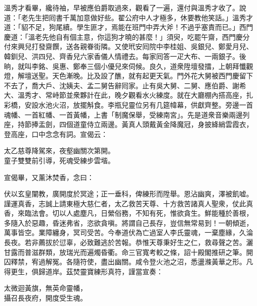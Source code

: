 溫秀才看畢，纔待袖，早被應伯爵取過來，觀看了一遍，還付與溫秀才收了。說道：「老先生把囘書千萬加意做好些。翟公府中人才極多，休要教他笑話。」溫秀才道：「貂不足，狗尾續。學生匪才，焉能在班門中弄大斧！不過乎塞責而已。」西門慶道：「溫老先他自有個主意，你這狗才曉的甚麼！」須臾，吃罷午齋，西門慶分付來興兒打發齋饌，送各親眷街隣。又使玳安囘院中李桂姐、吳銀兒、鄭愛月兒、韓釧兒、洪四兒、齊香兒六家香儀人情禮去。每家囘答一疋大布、一兩銀子。後晌，就叫李銘、吳惠、鄭奉三個小優兒來伺候。良久，道衆陞壇發擂，上朝拜懺觀燈，解壇送聖。天色漸晚。比及設了醮，就有起更天氣。門外花大舅被西門慶留下不去了，喬大戶、沈姨夫、孟二舅告辭囘家。止有吳大舅、二舅、應伯爵、謝希大、溫秀才、常峙節並衆夥計在此，晚夕觀看水火練度。就在大廳棚內搭高座，扎彩橋，安設水池火沼，放擺斛食。李瓶兒靈位另有几筵幃幕，供獻齊整。旁邊一首魂幡、一首紅幡、一首黃幡，上書「制魔保舉，受練南宮」。先是道衆音樂兩邊列座，持節捧盂劍，四個道童侍立兩邊。黃真人頭戴黃金降魔冠，身披絳綃雲霞衣，登高座，口中念念有詞。宣偈云：

\begin{myquote} 
太乙慈尊降駕來，夜壑幽關次第開。\\童子雙雙前引導，死魂受練步雲堦。
\end{myquote} 

宣偈畢，又薰沐焚香，念曰：

\begin{myquote}[\markfont]
伏以玄皇闡教，廣開度於冥途；正一垂科，俾練形而陞舉。恩沾幽爽，澤被飢嘘。謹運真香，志誠上請東極大慈仁者，太乙救苦天尊、十方救苦諸真人聖衆，仗此真香，來臨法會。切以人處塵凡，日縈俗務，不知有死，惟欲貪生。鮮能種於善根，多隨入於惡趣，昏迷弗省，恣欲貪嗔。將謂自己長存，豈信無常易到！一朝傾逝，萬事皆空。業障纏身，冥司受苦。今奉道伏為亡過室人李氏靈魂，一棄塵緣，久淪長夜。若非薦拔於愆辜，必致難逃於苦報。恭惟天尊秉好生之仁，救尋聲之苦。灑甘露而普滋群類，放瑞光而遍燭昏衢。命三官寬考較之條，詔十殿閣推研之筆。開囚釋禁，宥過解冤。各隨符使，盡出幽關。咸令登火池之沼，悉盪滌黃華之形。凡得更生，俱歸道岸。茲焚靈寶練形真符，謹當宣奏：

太微迴黃旗，無英命靈幡，\\攝召長夜府，開度受生魂。

\end{myquote} 

